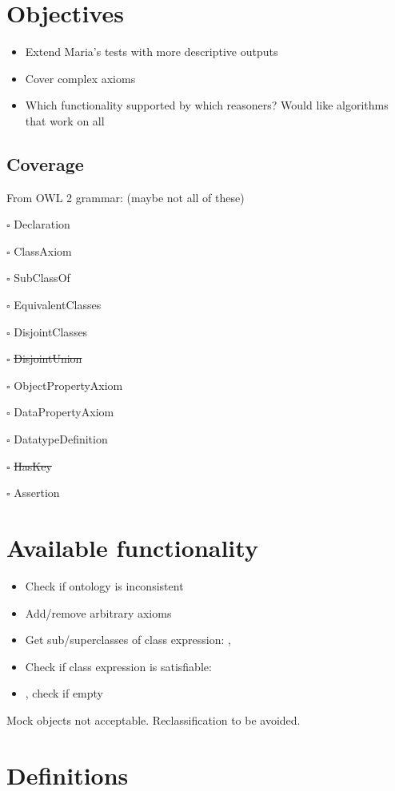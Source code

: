 \documentclass[11pt]{article}
\let\oldtextproc\textproc
\renewcommand{\textproc}[1]{\nohyphens{\oldtextproc{#1}}}
\newenvironment{checklist}{%
  \begin{list}{}{}
  \providecommand{\todo}{\item[$\square$]}
  \providecommand{\done}{\item[$\text{\rlap{$\checkmark$}}\square$]}
}{%
  \end{list}
}
\begin{document}
\section{Objectives}

\begin{itemize}
  \item Extend Maria's tests with more descriptive outputs
  \item Cover complex axioms
  \item Which functionality supported by which reasoners?  Would like algorithms that work on all
\end{itemize}

\subsection{Coverage}

From OWL 2 grammar: (maybe not all of these)
\begin{checklist}
  \todo Declaration
  \todo ClassAxiom
  \begin{checklist}
    \todo SubClassOf
    \todo EquivalentClasses
    \todo DisjointClasses
    \todo \st{DisjointUnion}
  \end{checklist}
  \todo ObjectPropertyAxiom
  \todo DataPropertyAxiom
  \todo DatatypeDefinition
  \todo \st{HasKey}
  \todo Assertion
\end{checklist}

\section{Available functionality}

\begin{itemize}
  \item Check if ontology is inconsistent
  \item Add/remove arbitrary axioms
  \item Get sub/superclasses of class expression: , 
  \item Check if class expression is satisfiable: 
  \item {}, check if empty
\end{itemize}

Mock objects not acceptable.  Reclassification to be avoided.

\section{Definitions}
\end{document}
